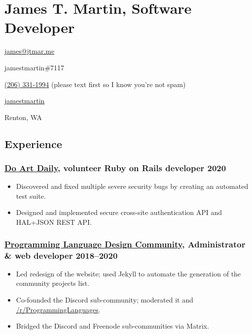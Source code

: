 \documentclass[12pt]{extarticle}
\author{James T. Martin}
\begin{document}
\section{James T. Martin, Software Developer}
\begin{description}[noitemsep,labelwidth=2cm]
\item[Email] \href{mailto:James\%20Martin<james@jtmar.me>}{james@jtmar.me}
\item[Discord] jamestmartin\#7117
\item[Phone] \href{tel:+1-206-331-1994}{(206) 331-1994} (please text first so I know you're not spam)
\item[GitHub] \href{https://github.com/jamestmartin}{jamestmartin}
\item[Location] Renton, WA
\end{description}

\subsection{Experience}
\subsubsection{\href{https://dad.gallery}{Do Art Daily}, volunteer Ruby on Rails developer \hfill 2020}
\begin{itemize}
\item Discovered and fixed multiple severe security bugs by creating an automated test suite.
\item Designed and implemented secure cross-site authentication API and HAL+JSON REST API.
\end{itemize}

\subsubsection{\href{https://proglangdesign.net}{Programming Language Design Community}, Administrator \& web developer \hfill 2018–2020}
\begin{itemize}
\item Led redesign of the website; used Jekyll to automate the generation of the community projects list.
\item Co-founded the Discord sub-community; moderated it and \href{https://reddit.com/r/ProgrammingLanguages}{/r/ProgrammingLanguages}.
\item Bridged the Discord and Freenode sub-communities via Matrix.
\end{itemize}
\end{document}
